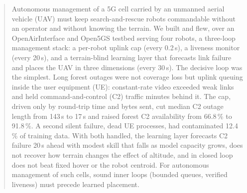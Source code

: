 \begin{abstract}
Autonomous management of a 5G cell carried by an unmanned aerial vehicle (UAV)
must keep search-and-rescue robots commandable without an operator and without
knowing the terrain. We built and flew, over an OpenAirInterface and Open5GS
testbed serving four robots, a three-loop management stack: a per-robot uplink
cap (every 0.2\,s), a liveness monitor (every 20\,s), and a terrain-blind
learning layer that forecasts link failure and places the UAV in three
dimensions (every 30\,s). The decisive loop was the simplest. Long forest
outages were not coverage loss but uplink queuing inside the user equipment
(UE): constant-rate video exceeded weak links and held command-and-control (C2)
traffic minutes behind it. The cap, driven only by round-trip time and bytes
sent, cut median C2 outage length from 143\,s to 17\,s and raised forest C2
availability from 66.8\,\% to 91.8\,\%. A second silent failure, dead UE
processes, had contaminated 12.4\,\% of training data. With both handled, the
learning layer forecasts C2 failure 20\,s ahead with modest skill that falls as
model capacity grows, does not recover how terrain changes the effect of
altitude, and in closed loop does not beat fixed hover or the robot centroid.
For autonomous management of such cells, sound inner loops (bounded queues,
verified liveness) must precede learned placement.
\end{abstract}
